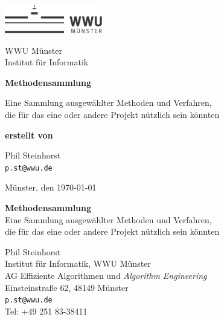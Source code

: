 \pagestyle{empty}
\begin{titlepage}
	\setlength{\parindent}{0pt}
	\begin{minipage}[b]{0.4\textwidth}
	\begin{flushleft}
	\includegraphics[width=4.25cm,keepaspectratio]{img/wwulogo17.pdf}\\[1cm]
	\end{flushleft}
	\end{minipage}
	\hfill
	\begin{minipage}[b]{0.5\textwidth}
	\begin{flushright}
	\sffamily\small
	WWU Münster \\
	Institut für Informatik
	\end{flushright}
	\end{minipage}

	\vspace{2.5cm}

	\begin{center}
		\sffamily\bfseries\Huge
		Methodensammlung

		\vspace{1cm}
		\normalfont\large\sffamily
		Eine Sammlung ausgewählter Methoden und Verfahren,\\
		die für das eine oder andere Projekt nützlich sein könnten

		\vspace{1cm}
		\normalsize\sffamily\bfseries
		erstellt von

		\vspace{0.3cm}
		\Large
		Phil Steinhorst \\
		\texttt{p.st@wwu.de}

		\vfill
		
		\normalfont\sffamily\small
		Münster, den \today
	\end{center}
\end{titlepage}

\hfill
\vfill
{
	\setlength{\parindent}{0pt}
	\small
	\textbf{Methodensammlung} \\
	Eine Sammlung ausgewählter Methoden und Verfahren,\\
	die für das eine oder andere Projekt nützlich sein könnten

	\vspace*{0.5cm}

	Phil Steinhorst \\
	Institut für Informatik, WWU Münster \\
	AG Effiziente Algorithmen und \textit{Algorithm Engineering} \\
	Einsteinstraße 62, 48149 Münster \\
	\texttt{p.st@wwu.de} \\
	Tel: +49 251 83-38411 \\
}

\cleardoublepage
\pagestyle{plain}
\setcounter{tocdepth}{1}
\tableofcontents
\cleardoublepage
{}
\setcounter{page}{1}
\pagestyle{headings}
